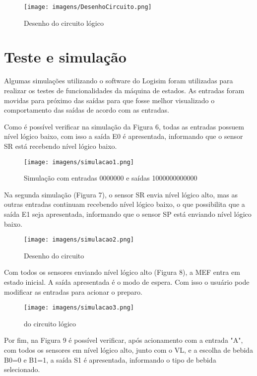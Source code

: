\begin{figure}[!h]
    \centering
    \texttt{[image: imagens/DesenhoCircuito.png]}
    \caption{Desenho do circuito lógico}
    \label{fig:desenhoCircuito}
\end{figure}

\section{Teste e simulação}

Algumas simulações utilizando o software do Logisim foram utilizadas para realizar os testes de funcionalidades da máquina de estados. As entradas foram movidas para próximo das saídas para que fosse melhor visualizado o comportamento das saídas de acordo com as entradas.

Como é possível verificar na simulação da Figura 6, todas as entradas possuem nível lógico baixo, com isso a saída E0 é apresentada, informando que o sensor SR está recebendo nível lógico baixo.

\begin{figure}[]
    \centering
    \texttt{[image: imagens/simulacao1.png]}
    \caption{Simulação com entradas 0000000 e saídas 1000000000000}
    \label{fig:simulacao1}
\end{figure}

Na segunda simulação (Figura 7), o sensor SR envia nível lógico alto, mas as outras entradas continuam recebendo nível lógico baixo, o que possibilita que a saída E1 seja apresentada, informando que o sensor SP está enviando nível lógico baixo.

\begin{figure}[]
    \centering
    \texttt{[image: imagens/simulacao2.png]}
    \caption{Desenho do circuito }
    \label{fig:simulacao2}
\end{figure}

Com todos os sensores enviando nível lógico alto (Figura 8), a MEF entra em estado inicial. A saída apresentada é o modo de espera. Com isso o usuário pode modificar as entradas para acionar o preparo.

\begin{figure}[]
    \centering
    \texttt{[image: imagens/simulacao3.png]}
    \caption{ do circuito lógico}
    \label{fig:simulacao3}
\end{figure}

Por fim, na Figura 9 é possível verificar, após acionamento com a entrada "A", com todos os sensores em nível lógico alto, junto com o VL, e a escolha de bebida B0=0 e B1=1, a saída S1 é apresentada, informando o tipo de bebida selecionado.

